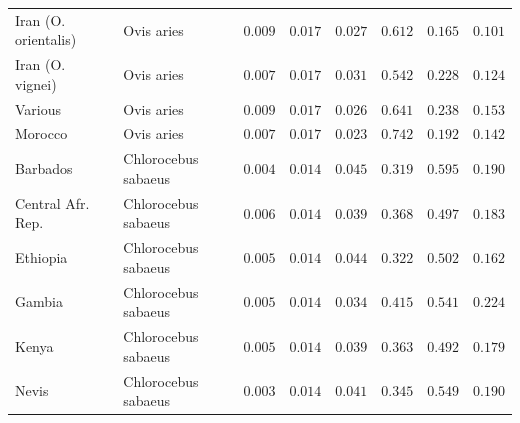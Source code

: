 \documentclass{article}
\begin{document}
\begin{center}
\begin{longtable*}{|l|l|r|r|r|r|r|r|}
            Iran (O. orientalis) &          Ovis aries &               $ 0.009$ &          $ 0.017$ &                   $ 0.027$ &                                          $ 0.612$ &                         $ 0.165$ &                      $ 0.101$ \\
            Iran (O. vignei) &          Ovis aries &               $ 0.007$ &          $ 0.017$ &                   $ 0.031$ &                                          $ 0.542$ &                         $ 0.228$ &                      $ 0.124$ \\
            Various &          Ovis aries &               $ 0.009$ &          $ 0.017$ &                   $ 0.026$ &                                          $ 0.641$ &                         $ 0.238$ &                      $ 0.153$ \\
            Morocco &          Ovis aries &               $ 0.007$ &          $ 0.017$ &                   $ 0.023$ &                                          $ 0.742$ &                         $ 0.192$ &                      $ 0.142$ \\
            Barbados & Chlorocebus sabaeus &               $ 0.004$ &          $ 0.014$ &                   $ 0.045$ &                                          $ 0.319$ &                         $ 0.595$ &                      $ 0.190$ \\
            Central Afr. Rep. & Chlorocebus sabaeus &               $ 0.006$ &          $ 0.014$ &                   $ 0.039$ &                                          $ 0.368$ &                         $ 0.497$ &                      $ 0.183$ \\
            Ethiopia & Chlorocebus sabaeus &               $ 0.005$ &          $ 0.014$ &                   $ 0.044$ &                                          $ 0.322$ &                         $ 0.502$ &                      $ 0.162$ \\
            Gambia & Chlorocebus sabaeus &               $ 0.005$ &          $ 0.014$ &                   $ 0.034$ &                                          $ 0.415$ &                         $ 0.541$ &                      $ 0.224$ \\
            Kenya & Chlorocebus sabaeus &               $ 0.005$ &          $ 0.014$ &                   $ 0.039$ &                                          $ 0.363$ &                         $ 0.492$ &                      $ 0.179$ \\
            Nevis & Chlorocebus sabaeus &               $ 0.003$ &          $ 0.014$ &                   $ 0.041$ &                                          $ 0.345$ &                         $ 0.549$ &                      $ 0.190$ \\

\end{longtable*}
\end{center}
\end{document}
